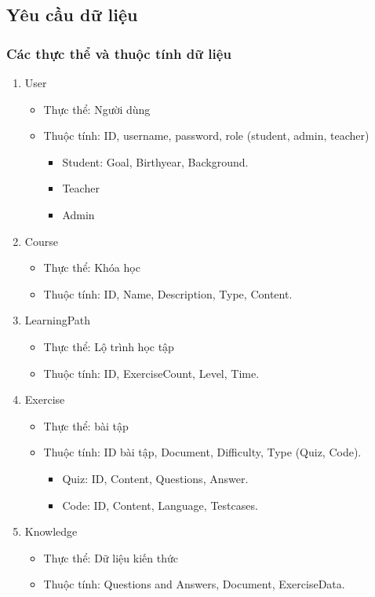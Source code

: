 \subsection{Yêu cầu dữ liệu}
\subsubsection{Các thực thể và thuộc tính dữ liệu}
\begin{enumerate}
    \item User
    \begin{itemize}
        \item Thực thể: Người dùng
        \item Thuộc tính: ID, username, password, role (student, admin, teacher)
        \begin{itemize}
            \item Student: Goal, Birthyear, Background.
            \item Teacher 
            \item Admin
        \end{itemize}
    \end{itemize}
    \item Course
    \begin{itemize}
        \item Thực thể: Khóa học
        \item Thuộc tính: ID, Name, Description, Type, Content.
    \end{itemize}
    \item LearningPath
    \begin{itemize}
        \item Thực thể: Lộ trình học tập
        \item Thuộc tính: ID, ExerciseCount, Level, Time.
    \end{itemize}
    \item Exercise
    \begin{itemize}
        \item Thực thể: bài tập
        \item Thuộc tính: ID bài tập, Document, Difficulty, Type (Quiz, Code).
        \begin{itemize}
            \item Quiz: ID, Content, Questions, Answer.
            \item Code: ID, Content, Language, Testcases.
        \end{itemize}
    \end{itemize}
    \item Knowledge
    \begin{itemize}
        \item Thực thể: Dữ liệu kiến thức
        \item Thuộc tính: Questions and Answers, Document, ExerciseData.
    \end{itemize}
\end{enumerate}
\newpage
